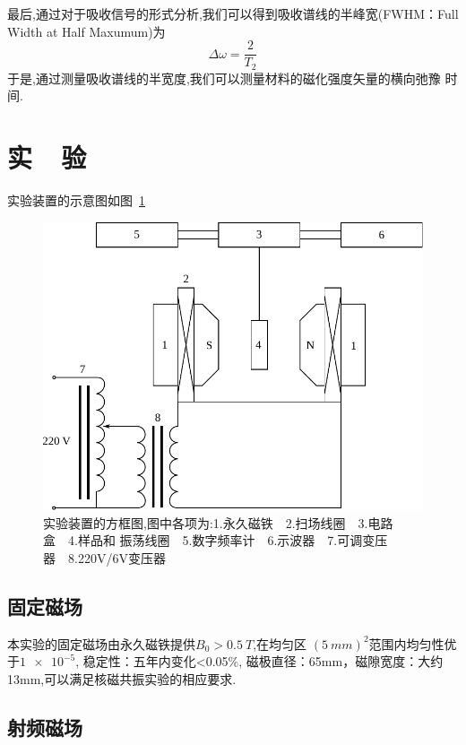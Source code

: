\documentclass{buaaemp}
\begin{document}
最后,通过对于吸收信号的形式分析,我们可以得到吸收谱线的半峰宽(FWHM：Full Width at Half Maxumum)为
\begin{equation}
\Delta \omega = \frac{2}{T_2}
\end{equation}
于是,通过测量吸收谱线的半宽度,我们可以测量材料的磁化强度矢量的横向弛豫
时间.

\section{实~~验}
实验装置的示意图如图~\ref{fig:ins}

\begin{figure}[htbp]
  \centering
\includegraphics[width=\linewidth]{image/drawing.pdf}
\caption{\label{fig:ins}%
实验装置的方框图,图中各项为:1.永久磁铁~~2.扫场线圈~~3.电路盒~~4.样品和
振荡线圈~~5.数字频率计~~6.示波器~~7.可调变压器~~8.220V/6V变压器
}
\end{figure}

\subsection{固定磁场}

本实验的固定磁场由永久磁铁提供$B_0 > \SI{0.5}{T}$,在均匀区
$(\SI{5}{mm})^2$范围内均匀性优于$\num{1e-5}$, 稳定性：五年内变化<0.05\%, 磁极直径：65mm，磁隙宽度：大约13mm,可以满足核磁共振实验的相应要求.

\subsection{射频磁场}
\end{document}
